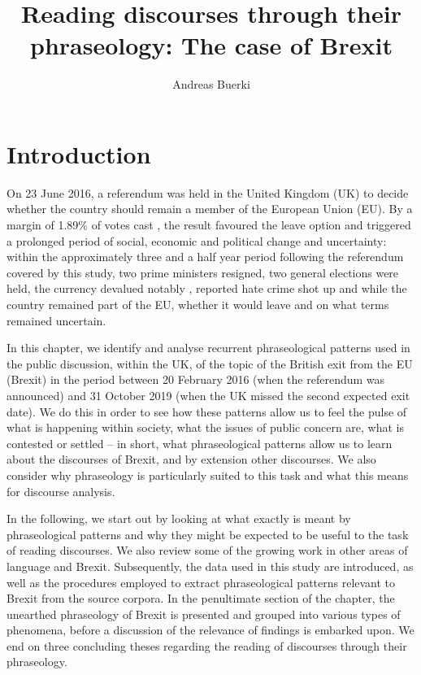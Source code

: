 \documentclass[output=paper]{langscibook}
\author{Andreas Buerki\affiliation{Cardiff University}}
\title[Reading discourses through their phraseology]{Reading discourses through their phraseology: The case of Brexit}
\begin{document}
\maketitle 

\section{Introduction}

On 23 June 2016, a referendum was held in the United Kingdom (UK) to decide whether the country should remain a member of the European Union (EU). By a margin of 1.89\% of votes cast \parencite{ElectoralCommission2019}, the result favoured the leave option and triggered a prolonged period of social, economic and political change and uncertainty: within the approximately three and a half year period following the referendum covered by this study, two prime ministers resigned, two general elections were held, the currency devalued notably \citep{fullfact.org2019a}, reported hate crime shot up \citep{fullfact.org2019b} and while the country remained part of the EU, whether it would leave and on what terms remained uncertain.

In this chapter, we identify and analyse recurrent phraseological patterns used in the public discussion, within the UK, of the topic of the British exit from the EU (Brexit) in the period between 20 February 2016 (when the referendum was announced) and 31 October 2019 (when the UK missed the second expected exit date). We do this in order to see how these patterns allow us to feel the pulse of what is happening within society, what the issues of public concern are, what is contested or settled -- in short, what phraseological patterns allow us to learn about the discourses of Brexit, and by extension other discourses. We also consider why phraseology is particularly suited to this task and what this means for discourse analysis.

In the following, we start out by looking at what exactly is meant by phraseological patterns and why they might be expected to be useful to the task of reading discourses. We also review some of the growing work in other areas of language and Brexit. Subsequently, the data used in this study are introduced, as well as the procedures employed to extract phraseological patterns relevant to Brexit from the source corpora. In the penultimate section of the chapter, the unearthed phraseology of Brexit is presented and grouped into various types of phenomena, before a discussion of the relevance of findings is embarked upon. We end on three concluding theses regarding the reading of discourses through their phraseology.
\end{document}
